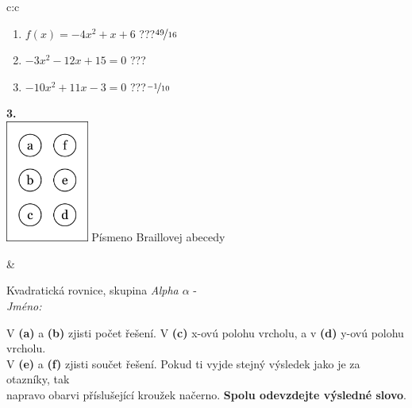 \documentclass[10pt]{report}
\begin{document}
\begin{tabular}{c:c}
\begin{minipage}[c][104.5mm][t]{0.5\linewidth}
\begin{center}
\begin{minipage}{0.79\linewidth}
\begin{center}
\begin{varwidth}{\linewidth}
\begin{enumerate}
\item $f(x)=-4x^2+x+6$\quad \dotfill\; ???\;\dotfill \quad $\nicefrac{49}{16}$
\item $-3x^2-12x+15=0$\quad \dotfill\; ???\;\dotfill {}
\item $-10x^2+11x-3=0$\quad \dotfill\; ???\;\dotfill \quad $\nicefrac{-1}{10}$
\end{enumerate}
\end{varwidth}
\end{center}
\end{minipage}
\begin{minipage}{0.20\linewidth}
\begin{center}
{\Huge\bfseries 3.} \\[2mm]
\includegraphics[height=40mm]{../images/braille.png}
{\small Písmeno Braillovej abecedy}
\end{center}
\end{minipage}
\end{center}
\end{minipage}
&
\begin{minipage}[c][104.5mm][t]{0.5\linewidth}
\begin{center}
\vspace{7mm}
{\huge Kvadratická rovnice, skupina \textit{Alpha $\alpha$} -}\\[5mm]
\textit{Jméno:}\phantom{xxxxxxxxxxxxxxxxxxxxxxxxxxxxxxxxxxxxxxxxxxxxxxxxxxxxxxxxxxxxxxxxx}\\[5mm]
\begin{minipage}{0.95\linewidth}
\begin{center}
V \textbf{(a)} a \textbf{(b)} zjisti počet řešení. V \textbf{(c)} x-ovú polohu vrcholu, a v \textbf{(d)} y-ovú polohu vrcholu.\\V \textbf{(e)} a \textbf{(f)} zjisti součet řešení. Pokud ti vyjde stejný výsledek jako je za otazníky, tak\\napravo obarvi příslušející kroužek načerno. \textbf{Spolu odevzdejte výsledné slovo}.
\end{center}
\end{minipage}
\\[1mm]

\end{center}
\end{minipage}
\end{tabular}
\end{document}
